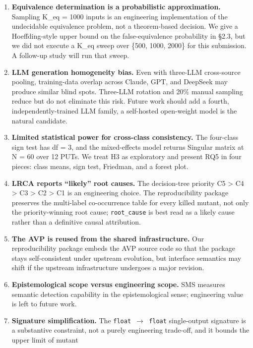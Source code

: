 \documentclass[review,12pt,authoryear]{elsarticle}
\begin{document}
\begin{enumerate}
\def\labelenumi{(\alph{enumi})}
\item
  \textbf{Equivalence determination is a probabilistic approximation.}
  Sampling K\_eq = 1000 inputs is an engineering implementation of the
  undecidable equivalence problem, not a theorem-based decision. We give
  a Hoeffding-style upper bound on the false-equivalence probability in
  §2.3, but we did not execute a K\_eq sweep over \{500, 1000, 2000\}
  for this submission. A follow-up study will run that sweep.
\item
  \textbf{LLM generation homogeneity bias.} Even with three-LLM
  cross-source pooling, training-data overlap across Claude, GPT, and
  DeepSeek may produce similar blind spots. Three-LLM rotation and 20\%
  manual sampling reduce but do not eliminate this risk. Future work
  should add a fourth, independently-trained LLM family, a self-hosted
  open-weight model is the natural candidate.
\item
  \textbf{Limited statistical power for cross-class consistency.} The
  four-class sign test has df = 3, and the mixed-effects model returns
  Singular matrix at N = 60 over 12 PUTs. We treat H3 as exploratory and
  present RQ5 in four pieces: class means, sign test, Friedman, and a
  forest plot.
\item
  \textbf{LRCA reports ``likely'' root causes.} The decision-tree
  priority C5 \textgreater{} C4 \textgreater{} C3 \textgreater{} C2
  \textgreater{} C1 is an engineering choice. The reproducibility
  package preserves the multi-label co-occurrence table for every killed
  mutant, not only the priority-winning root cause; \texttt{root\_cause}
  is best read as a likely cause rather than a definitive causal
  attribution.
\item
  \textbf{The AVP is reused from the shared infrastructure.} Our reproducibility package
  embeds the AVP source code so that the package stays self-consistent under upstream
  evolution, but interface semantics may shift if the upstream infrastructure undergoes a major
  revision.
\item
  \textbf{Epistemological scope versus engineering scope.} SMS measures
  semantic detection capability in the epistemological sense;
  engineering value is left to future work.
\item
  \textbf{Signature simplification.} The \texttt{float\ $\to$\ float}
  single-output signature is a substantive constraint, not a purely
  engineering trade-off, and it bounds the upper limit of mutant

\end{enumerate}
\end{document}
